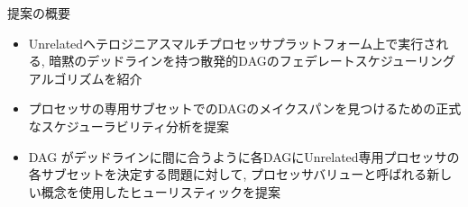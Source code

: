 
\begin{frame}{提案の概要}
    \begin{itemize}
        \item Unrelatedヘテロジニアスマルチプロセッサプラットフォーム上で実行される, 暗黙のデッドラインを持つ散発的DAGのフェデレートスケジューリングアルゴリズムを紹介

        \item プロセッサの専用サブセットでのDAGのメイクスパンを見つけるための正式なスケジューラビリティ分析を提案

        \item DAG がデッドラインに間に合うように各DAGにUnrelated専用プロセッサの各サブセットを決定する問題に対して, プロセッサバリューと呼ばれる新しい概念を使用したヒューリスティックを提案
    \end{itemize}
\end{frame}
